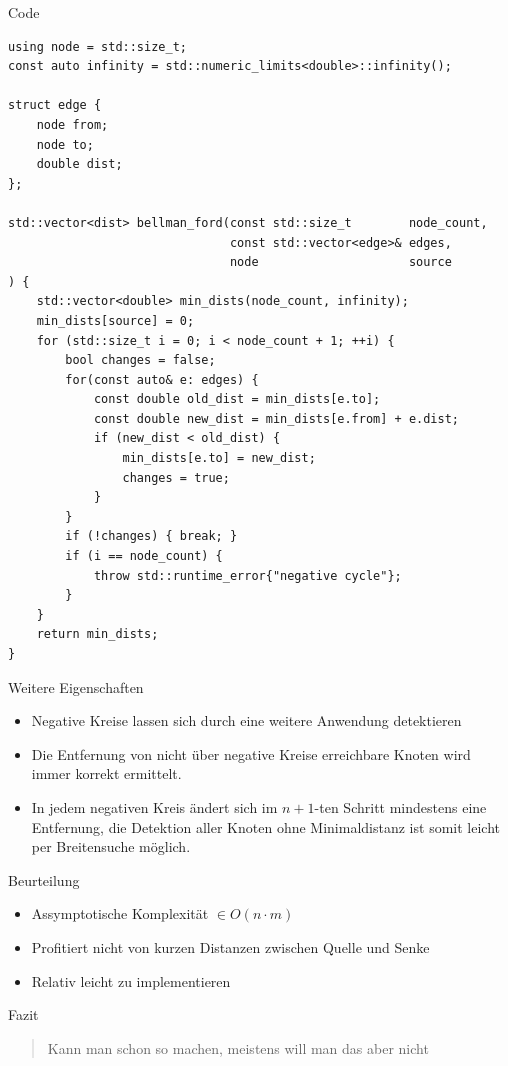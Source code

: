 \begin{frame}[fragile]{Code}
\begin{lstlisting}[basicstyle=\tiny]
using node = std::size_t;
const auto infinity = std::numeric_limits<double>::infinity();

struct edge {
    node from;
    node to;
    double dist;
};

std::vector<dist> bellman_ford(const std::size_t        node_count,
                               const std::vector<edge>& edges,
                               node                     source
) {
    std::vector<double> min_dists(node_count, infinity);
    min_dists[source] = 0;
    for (std::size_t i = 0; i < node_count + 1; ++i) {
        bool changes = false;
        for(const auto& e: edges) {
            const double old_dist = min_dists[e.to];
            const double new_dist = min_dists[e.from] + e.dist;
            if (new_dist < old_dist) {
                min_dists[e.to] = new_dist;
                changes = true;
            }
        }
        if (!changes) { break; }
        if (i == node_count) {
            throw std::runtime_error{"negative cycle"};
        }
    }
    return min_dists;
}
\end{lstlisting}
\end{frame}

\begin{frame}{Weitere Eigenschaften}
\begin{itemize}
	\item Negative Kreise lassen sich durch eine weitere Anwendung detektieren
	\item Die Entfernung von nicht über negative Kreise erreichbare Knoten wird immer korrekt ermittelt.
	\item In jedem negativen Kreis ändert sich im $n + 1$-ten Schritt mindestens eine Entfernung,
		die Detektion aller Knoten ohne Minimaldistanz ist somit leicht per Breitensuche möglich.
\end{itemize}
\end{frame}

\begin{frame}{Beurteilung}
\begin{itemize}
\itemsep1pt\parskip0pt
\item
  Assymptotische Komplexität $\in O(n \cdot m)$
\item
  Profitiert nicht von kurzen Distanzen zwischen Quelle und Senke
\item
  Relativ leicht zu implementieren
\end{itemize}

\end{frame}

\begin{frame}{Fazit}

\begin{quote}
Kann man schon so machen, meistens will man das aber nicht
\end{quote}

\end{frame}
